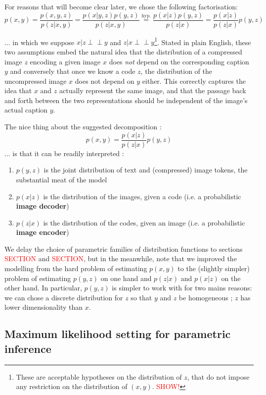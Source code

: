 \documentclass{article}
\begin{document}
\begin{appendix}
For reasons that will become clear later, we chose the following factorisation: $$p(x,y)=\frac{p(x,y,z)}{p(z|x,y)}=\frac{p(x|y,z)p(y,z)}{p(z|x,y)}\overset{\text{hyp.}}{=}\frac{p(x|z)p(y,z)}{p(z|x)}=\frac{p(x|z)}{p(z|x)}p(y,z)$$

... in which we suppose $x|z \perp\!\!\!\perp y$ and $z|x \perp\!\!\!\perp y$\footnote{These are acceptable hypotheses on the distribution of $z$, that do not impose any restriction on the distribution of $(x,y)$. \textcolor{red}{SHOW!}}.
Stated in plain English, these two assumptions embed the natural idea that the distribution of a compressed image $z$ encoding a given image $x$ does \textit{not} depend on the corresponding caption $y$ and conversely that once we know a code $z$, the distribution of the uncompressed image $x$ does not depend on $y$ either.
This correctly captures the idea that $x$ and $z$ actually represent the same image, and that the passage back and forth between the two representations should be independent of the image's actual caption $y$.

The nice thing about the suggested decomposition :
$$p(x,y)=\frac{p(x|z)}{p(z|x)}p(y,z)$$
... is that it can be readily interpreted :
\begin{enumerate}
    \item $p(y,z)$ is the joint distribution of text and (compressed) image tokens, the substantial meat of the model
    \item $p(x|z)$ is the distribution of the images, given a code (i.e. a probabilistic \textbf{image decoder})
    \item $p(z|x)$ is the distribution of the codes, given an image (i.e. a probabilistic \textbf{image encoder})
\end{enumerate}

We delay the choice of parametric families of distribution functions to sections \textcolor{red}{SECTION} and \textcolor{red}{SECTION}, but in the meanwhile, note that we improved the modelling from the hard problem of estimating $p(x,y)$ to the (slightly simpler) problem of estimating $p(y,z)$ on one hand and $p(z|x)$ and $p(x|z)$ on the other hand. In particular, $p(y,z)$ is simpler to work with for two mains reasons: we can chose a discrete distribution for $z$ so that $y$ and $z$ be homogeneous ; $z$ has lower dimensionality than $x$.

\subsection{Maximum likelihood setting for parametric inference}


\end{appendix}
\end{document}
